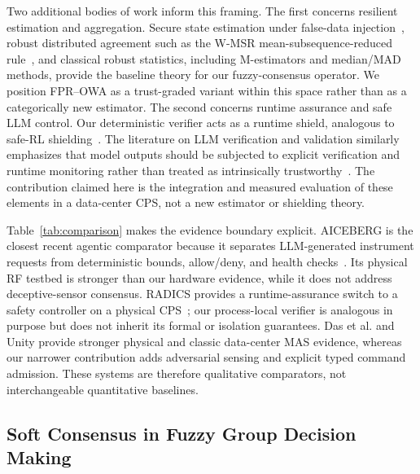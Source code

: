 \documentclass[smartcities,article,submit,moreauthors]{Definitions/mdpi}
\begin{document}
Two additional bodies of work inform this framing. The first concerns
resilient estimation and aggregation. Secure state estimation under
false-data injection~\cite{pasqualetti2013,fawzi2014}, robust
distributed agreement such as the W-MSR mean-subsequence-reduced
rule~\cite{leblanc2013}, and classical robust statistics, including
M-estimators and median/MAD methods, provide the baseline theory for our
fuzzy-consensus operator. We position FPR--OWA as a trust-graded variant
within this space rather than as a categorically new estimator. The
second concerns runtime assurance and safe LLM control. Our deterministic
verifier acts as a runtime shield, analogous to safe-RL
shielding~\cite{alshiekh2018,konighofer2020}. The literature on LLM verification and validation similarly emphasizes
that model outputs should be subjected to explicit verification and runtime
monitoring rather than treated as intrinsically trustworthy~\cite{huang2024verification}. The contribution claimed here is
the integration and measured evaluation of these elements in a
data-center CPS, not a new estimator or shielding theory.

Table~\ref{tab:comparison} makes the evidence boundary explicit. AICEBERG is
the closest recent agentic comparator because it separates LLM-generated
instrument requests from deterministic bounds, allow/deny, and health
checks~\cite{popescu2026aiceberg}. Its physical RF testbed is stronger than
our hardware evidence, while it does not address deceptive-sensor consensus.
RADICS provides a runtime-assurance switch to a safety controller on a physical
CPS~\cite{wheatman2022radics}; our process-local verifier is analogous in
purpose but does not inherit its formal or isolation guarantees. Das et al. and
Unity provide stronger physical and classic data-center MAS evidence, whereas
our narrower contribution adds adversarial sensing and explicit typed command
admission. These systems are therefore qualitative comparators, not
interchangeable quantitative baselines.



\subsection{Soft Consensus in Fuzzy Group Decision Making}
\label{sec:related_gdm}
\end{document}
